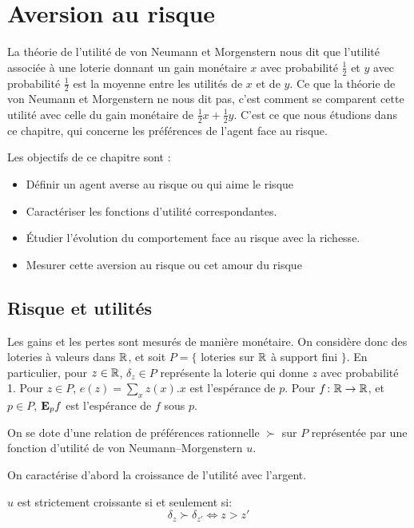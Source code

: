 \chapter{Aversion au risque}

La théorie de l'utilité de von Neumann et Morgenstern nous dit que
l'utilité associée à une loterie donnant un gain monétaire $x$
avec probabilité $\frac12$ et $y$ avec probabilité $\frac12$ est
la moyenne entre les utilités de $x$ et de $y$. Ce que la théorie
de von Neumann et Morgenstern ne nous dit pas, c'est comment se
comparent cette utilité avec celle du gain monétaire de $\frac12 x
+ \frac12 y$. C'est ce que nous étudions dans ce chapitre, qui
concerne les préférences de l'agent face au risque.

Les objectifs de ce chapitre sont :%
\begin{itemize}
\item D\'efinir un agent averse au risque ou qui aime le risque
\item Caractériser les fonctions d'utilité correspondantes. %
\item Étudier l'évolution du comportement face au risque avec la
richesse.
\item Mesurer cette aversion au risque ou cet amour du risque %
\end{itemize}

\section{Risque et utilités}

Les gains et les pertes sont mesurés de manière monétaire. On
considère donc des loteries à valeurs dans $\mathbb R$, et soit $P=
\{$ loteries sur $\mathbb R$ \`a support fini $\}$. En particulier,
pour $z\in \mathbb R$, $\delta_z\in P$ représente la loterie qui
donne $z$ avec probabilité 1. Pour $z\in P$, $e(z)=\sum_x z(x).x$
est l'espérance de $p$. Pour $f\colon \mathbb R\to\mathbb R$, et $p\in
P$, $\mathbf{E}_p f$ est l'esp\'erance de $f$ sous $p$.

On se dote d'une relation de pr\'ef\'erences rationnelle $\succ$
sur $P$ repr\'esent\'ee par une fonction d'utilit\'e de von
Neumann--Morgenstern $u$.

On caractérise d'abord la croissance de l'utilité avec l'argent.
\begin{proposition}
$u$ est strictement croissante si et seulement si:
$$
\delta_z \succ \delta_{z'} \Leftrightarrow z > z'
$$
\end{proposition}

